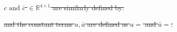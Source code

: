 \documentclass[10pt]{article}
\newcommand{\R}{\mathbb{R}}
\providecommand{\DIFdeltex}[1]{{\protect\color{red}\sout{#1}}}                      %
\providecommand{\DIFdel}[1]{\texorpdfstring{\DIFdeltex{#1}}{}} %
\begin{document}

\DIFdel{\(c \text{ and } \bar{c}\) \(\in \R^{4 \times 1}\) are similarly defined by:
}%

\DIFdel{and the constant terms \(a, \bar{a}\) are defined as \(a = \) and
    \(\bar{a} = \).
}%
\end{document}
